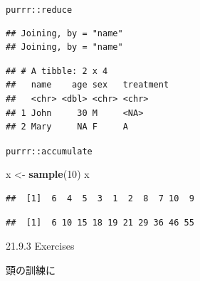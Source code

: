 \documentclass[ignorenonframetext,]{beamer}
\newenvironment{Shaded}{\begin{snugshade}}{\end{snugshade}}
\newcommand{\KeywordTok}[1]{\textcolor[rgb]{0.13,0.29,0.53}{\textbf{#1}}}
\newcommand{\DataTypeTok}[1]{\textcolor[rgb]{0.13,0.29,0.53}{#1}}
\newcommand{\DecValTok}[1]{\textcolor[rgb]{0.00,0.00,0.81}{#1}}
\newcommand{\StringTok}[1]{\textcolor[rgb]{0.31,0.60,0.02}{#1}}
\newcommand{\OperatorTok}[1]{\textcolor[rgb]{0.81,0.36,0.00}{\textbf{#1}}}
\newcommand{\NormalTok}[1]{#1}
\begin{document}
\begin{frame}[fragile]{\texttt{purrr::reduce}}

\begin{Shaded}
\end{Shaded}

\begin{verbatim}
## Joining, by = "name"
## Joining, by = "name"
\end{verbatim}

\begin{verbatim}
## # A tibble: 2 x 4
##   name    age sex   treatment
##   <chr> <dbl> <chr> <chr>    
## 1 John     30 M     <NA>     
## 2 Mary     NA F     A
\end{verbatim}

\end{frame}

\begin{frame}[fragile]{\texttt{purrr::accumulate}}

\begin{Shaded}
\begin{Highlighting}[]
\NormalTok{x <-}\StringTok{ }\KeywordTok{sample}\NormalTok{(}\DecValTok{10}\NormalTok{)}
\NormalTok{x}
\end{Highlighting}
\end{Shaded}

\begin{verbatim}
##  [1]  6  4  5  3  1  2  8  7 10  9
\end{verbatim}

\begin{Shaded}
\end{Shaded}

\begin{verbatim}
##  [1]  6 10 15 18 19 21 29 36 46 55
\end{verbatim}

\end{frame}

\begin{frame}{21.9.3 Exercises}

頭の訓練に

\end{frame}
\end{document}
